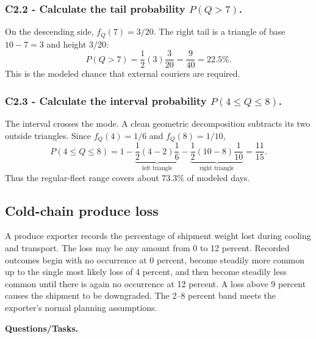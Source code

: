 \subsubsection*{C2.2 - Calculate the tail probability $P(Q>7)$.}
\label{subsec:c2-triangular-lastmile-b}
On the descending side, $f_Q(7)=3/20$.  The right tail is a triangle of base
$10-7=3$ and height $3/20$:
\[
 P(Q>7)=\frac12(3)\frac3{20}=\frac9{40}=22.5\%.
\]
This is the modeled chance that external couriers are required.

\subsubsection*{C2.3 - Calculate the interval probability $P(4\le Q\le8)$.}
\label{subsec:c2-triangular-lastmile-c}
The interval crosses the mode.  A clean geometric decomposition subtracts its
two outside triangles.  Since $f_Q(4)=1/6$ and $f_Q(8)=1/10$,
\[
 P(4\le Q\le8)
 =1-\underbrace{\frac12(4-2)\frac16}_{\text{left triangle}}
   -\underbrace{\frac12(10-8)\frac1{10}}_{\text{right triangle}}
 =\frac{11}{15}.
\]
Thus the regular-fleet range covers about $73.3\%$ of modeled days.

\subsection{Cold-chain produce loss}\label{sec:c2-triangular-produce}
A produce exporter records the percentage of shipment weight lost during
cooling and transport.  The loss may be any amount from 0 to 12 percent.
Recorded outcomes begin with no occurrence at 0 percent, become
steadily more common up to the single most likely loss of 4 percent, and then
become steadily less common until there is again no occurrence at
12 percent.  A loss above 9 percent causes the shipment to be downgraded.  The
2--8 percent band meets the exporter's normal planning assumptions.

\begingroup{}
\endgroup

\textbf{Questions/Tasks.}
\begin{enumerate}
\end{enumerate}

